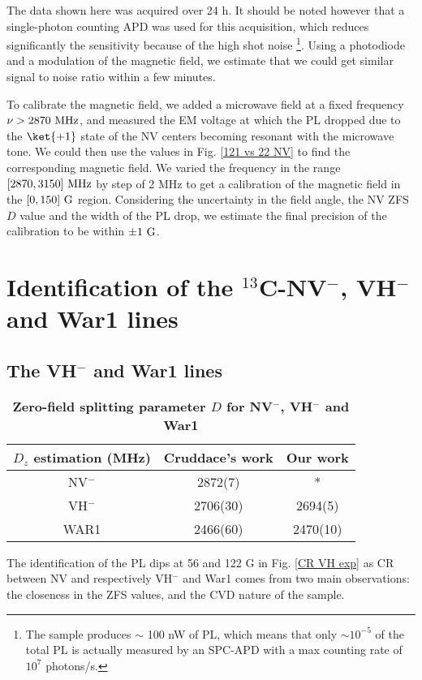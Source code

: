\documentclass[a4paper, 11pt]{report}
\begin{document}
The data shown here was acquired over 24 h. It should be noted however that a single-photon counting APD was used for this acquisition, which reduces significantly the sensitivity because of the high shot noise \footnote{The sample produces $\sim$ 100 nW of PL, which means that only $\sim 10^{-5}$ of the total PL is actually measured by an SPC-APD with a max counting rate of $10^7$ photons/s.}. Using a photodiode and a modulation of the magnetic field, we estimate that we could get similar signal to noise ratio within a few minutes.

To calibrate the magnetic field, we added a microwave field at a fixed frequency $\nu > 2870\ \rm MHz$, and measured the EM voltage at which the PL dropped due to the $\ket{+1}$ state of the NV centers becoming resonant with the microwave tone. We could then use the values in Fig. \ref{121 vs 22 NV} to find the corresponding magnetic field. We varied the frequency in the range $[2870,3150]\ \rm MHz$ by step of 2 MHz to get a calibration of the magnetic field in the $[0,150]\ \rm G$ region. Considering the uncertainty in the field angle, the NV ZFS $D$ value and the width of the PL drop, we estimate the final precision of the calibration to be within $\pm 1\ \rm G$.

\section{Identification of the $^{13}$C-NV$^-$, VH$^-$ and War1 lines}

\subsection{The VH$^-$ and War1 lines}
\begin{table}[htbp]
\centering
\caption{\bf Zero-field splitting parameter $D$ for NV$^-$, VH$^-$ and War1}
\begin{tabular}{ccc}
\hline
$D_z$ estimation (MHz) & Cruddace's work\citep{cruddace2007magnetic} & Our work \\
\hline
NV$^-$ & 2872(7) & * \\
VH$^-$ & 2706(30) & 2694(5) \\
WAR1 & 2466(60) & 2470(10) \\
\hline
\end{tabular}
\label{table VH et War1}
\end{table}

The identification of the PL dips at 56 and 122 G in Fig. \ref{CR VH exp} as CR between NV and respectively VH$^-$ and War1 comes from two main observations: the closeness in the ZFS values, and the CVD nature of the sample.
\end{document}
